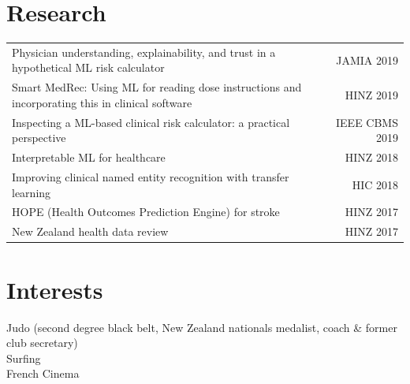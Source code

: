 \documentclass[letterpaper,11pt]{article}
\begin{document}
\section{Research} 
\begin{tabular*}{\textwidth}{l@{\extracolsep{\fill}}r}
{\small Physician understanding, explainability, and trust in a hypothetical ML risk calculator} & {\small JAMIA 2019}\\
{\small Smart MedRec: Using ML for reading dose instructions and incorporating this in clinical software} & {\small HINZ 2019}\\
{\small Inspecting a ML-based clinical risk calculator: a practical perspective} & {\small IEEE CBMS 2019}\\
{\small Interpretable ML for healthcare} & {\small HINZ 2018}\\
{\small Improving clinical named entity recognition with transfer learning} & {\small HIC 2018}\\
{\small HOPE (Health Outcomes Prediction Engine) for stroke} & {\small HINZ 2017}\\
{\small New Zealand health data review} & {\small HINZ 2017}\\
\end{tabular*}



\section{Interests}
{\small Judo (second degree black belt, New Zealand nationals medalist, coach \& former club secretary)}\\
{\small Surfing}\\
{\small French Cinema}
\end{document}
